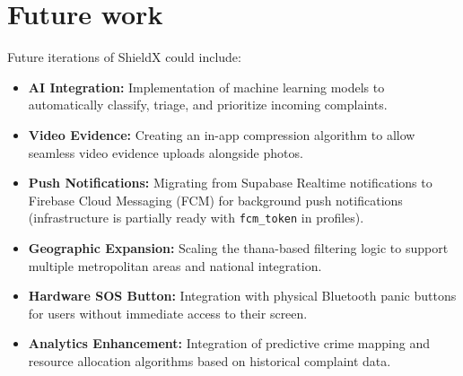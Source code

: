 \documentclass[12pt, a4paper, twoside]{report}
\begin{document}
\section{Future work}
Future iterations of ShieldX could include:
\begin{itemize}
    \item \textbf{AI Integration:} Implementation of machine learning models to automatically classify, triage, and prioritize incoming complaints.
    \item \textbf{Video Evidence:} Creating an in-app compression algorithm to allow seamless video evidence uploads alongside photos.
    \item \textbf{Push Notifications:} Migrating from Supabase Realtime notifications to Firebase Cloud Messaging (FCM) for background push notifications (infrastructure is partially ready with \texttt{fcm\_token} in profiles).
    \item \textbf{Geographic Expansion:} Scaling the thana-based filtering logic to support multiple metropolitan areas and national integration.
    \item \textbf{Hardware SOS Button:} Integration with physical Bluetooth panic buttons for users without immediate access to their screen.
    \item \textbf{Analytics Enhancement:} Integration of predictive crime mapping and resource allocation algorithms based on historical complaint data.
\end{itemize}
\end{document}
